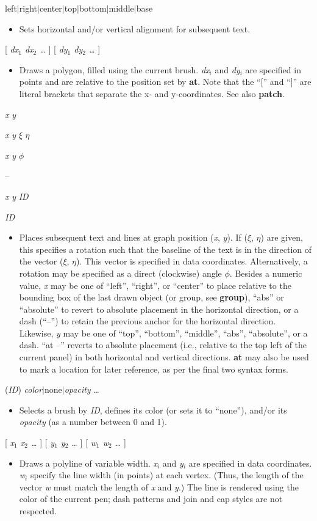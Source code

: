 \documentclass[11pt]{article}
\def\cmd#1#2{\noindent {\bf #1} #2\par}
\def\expl#1{\kern-8pt\begin{itemize}\item[]#1\end{itemize}}
\def\cref#1{{\bf #1}}
\def\bar{{$|$}}
\begin{document}
\cmd{align}{left\bar{}right\bar{}center\bar{}top\bar{}bottom\bar{}middle\bar{}base}
\expl{Sets horizontal and/or vertical alignment for subsequent text.}

\cmd{area}{[ \emph{dx$_1$ dx$_2$ \ldots} ] [ \emph{dy$_1$ dy$_2$ \ldots}
]}
\expl{Draws a polygon, filled using the current brush. 
  \emph{dx$_i$} and \emph{dy$_i$} are specified in
  points and are relative to the position set by \cref{at}. Note that
  the ``['' and ``]'' are literal brackets that separate the x- and 
  y-coordinates. See also \cref{patch}.}

\cmd{at}{\emph{x} \emph{y}}
\cmd{at}{\emph{x} \emph{y} \emph{$\xi$} \emph{$\eta$}}
\cmd{at}{\emph{x} \emph{y} \emph{$\phi$}}
\cmd{at}{--}
\cmd{at}{\emph{x} \emph{y} \emph{ID}}
\cmd{at}{\emph{ID}}
\expl{Places subsequent text and lines at graph
    position (\emph{x}, \emph{y}). If (\emph{$\xi$}, \emph{$\eta$})
    are given, this specifies a rotation such that the baseline of the
    text is in the direction of the vector (\emph{$\xi$},
    \emph{$\eta$}). This vector is specified in data
    coordinates. Alternatively, a rotation may be specified as a
    direct (clockwise) angle $\phi$. Besides a numeric value, \emph{x}
    may be one of {``left''}, {``right''}, or {``center''} to place 
    relative to the
    bounding box of the last drawn object (or group, see
    \cref{group}), ``abs'' or ``absolute'' to revert to absolute
    placement in the horizontal direction, or a dash (``--'') to
    retain the previous anchor for
    the horizontal direction.  
    Likewise, \emph{y} may be one of {``top''}, {``bottom''},
    {``middle''}, ``abs'', ``absolute'', or a dash. ``at --''
    reverts to absolute placement (i.e., relative to the top left of the
    current panel)
    in both horizontal and vertical directions. \cref{at} may also be
    used to mark a location for later reference, as per the final two
    syntax forms.}

\cmd{brush}{(\emph{ID}) \emph{color}\bar{}none\bar{}\emph{opacity} \ldots}
\expl{Selects a brush by \emph{ID}, defines its color (or sets it to
  ``none''), and/or its \emph{opacity} (as a number between 0 and 1).}

\cmd{caligraph}{[ \emph{x$_1$ x$_2$ \ldots} ] 
                [ \emph{y$_1$ y$_2$ \ldots} ]
                [ \emph{w$_1$ w$_2$ \ldots} ]}
\expl{Draws a polyline of variable width.  \emph{x$_i$}
  and \emph{y$_i$} are specified in data coordinates. \emph{w$_i$}
  specify the line width (in points) at each vertex. (Thus, the length
  of the vector \emph{w} must match the length of \emph{x} and
  \emph{y}.) The line is rendered using the color of the current pen;
  dash patterns and join and cap styles are not respected.}
\end{document}
